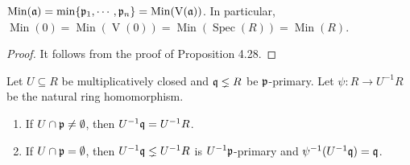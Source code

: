 \begin{proposition}
    $\operatorname{Min}(\mathfrak{a}) = \min\{\mathfrak{p}_1,\cdots,\mathfrak{p}_n\} = \operatorname{Min}(\operatorname{V}(\mathfrak{a}))$. In particular, $\operatorname{Min}(0) = \operatorname{Min}(\operatorname{V}(0)) = \operatorname{Min}(\operatorname{Spec}(R)) = \operatorname{Min}(R)$.
\end{proposition}

\begin{proof}
    It follows from the proof of Proposition 4.28.
\end{proof}

\begin{lemma}
    Let $U \subseteq R$ be multiplicatively closed and $\mathfrak{q} \lneq R$ be $\mathfrak{p}$-primary. Let $\psi: R \to U^{-1}R$ be the natural ring homomorphism.
    \begin{enumerate}
        \item If $U \cap \mathfrak{p} \neq \emptyset$, then $U^{-1}\mathfrak{q} = U^{-1}R$.
        \item If $U \cap \mathfrak{p} = \emptyset$, then $U^{-1}\mathfrak{q} \lneq U^{-1}R$ is $U^{-1}\mathfrak{p}$-primary and $\psi^{-1}(U^{-1}\mathfrak{q}) = \mathfrak{q}$.
    \end{enumerate}
\end{lemma}

